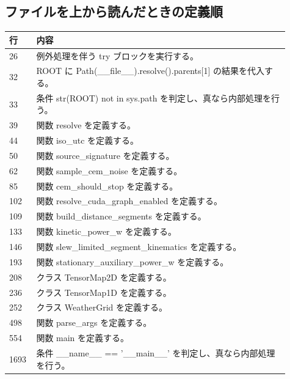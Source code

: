 \documentclass[a4paper,11pt]{article}
\begin{document}
        \subsection{ファイルを上から読んだときの定義順}
            \begin{longtable}{p{0.07\linewidth} p{0.84\linewidth}}
            \toprule
            行 & 内容 \\
            \midrule
            26 & 例外処理を伴う try ブロックを実行する。 \\
32 & ROOT に Path(\_\_file\_\_).resolve().parents[1] の結果を代入する。 \\
33 & 条件 str(ROOT) not in sys.path を判定し、真なら内部処理を行う。 \\
39 & 関数 resolve を定義する。 \\
44 & 関数 iso\_utc を定義する。 \\
50 & 関数 source\_signature を定義する。 \\
62 & 関数 sample\_cem\_noise を定義する。 \\
85 & 関数 cem\_should\_stop を定義する。 \\
102 & 関数 resolve\_cuda\_graph\_enabled を定義する。 \\
109 & 関数 build\_distance\_segments を定義する。 \\
133 & 関数 kinetic\_power\_w を定義する。 \\
146 & 関数 slew\_limited\_segment\_kinematics を定義する。 \\
193 & 関数 stationary\_auxiliary\_power\_w を定義する。 \\
208 & クラス TensorMap2D を定義する。 \\
236 & クラス TensorMap1D を定義する。 \\
252 & クラス WeatherGrid を定義する。 \\
498 & 関数 parse\_args を定義する。 \\
554 & 関数 main を定義する。 \\
1693 & 条件 \_\_name\_\_ == '\_\_main\_\_' を判定し、真なら内部処理を行う。 \\
            \bottomrule
            \end{longtable}
\end{document}
